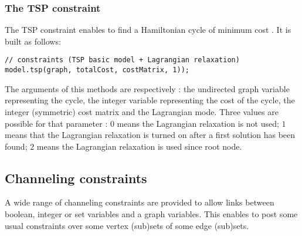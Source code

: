 \documentclass{article}
\begin{document}
\subsubsection{The TSP constraint}

The TSP constraint enables to find a Hamiltonian cycle of minimum cost \cite{Benchimol12}. It is built as follows:
\begin{lstlisting}
// constraints (TSP basic model + Lagrangian relaxation)
model.tsp(graph, totalCost, costMatrix, 1));
\end{lstlisting}

The arguments of this methods are respectively : the undirected graph variable representing the cycle, the integer variable representing the cost of the cycle, the integer (symmetric) cost matrix and the Lagrangian mode. Three values are possible for that parameter : $0$ means the Lagrangian relaxation is not used; $1$ means that the Lagrangian relaxation is turned on after a first solution has been found; $2$ means the Lagrangian relaxation is used since root node.

%
%

\subsection{Channeling constraints}

A wide range of channeling constraints are provided to allow links between boolean, integer or set variables and a graph variables. 
This enables to post some usual constraints over some vertex (sub)sets of some edge (sub)sets. 
\end{document}
